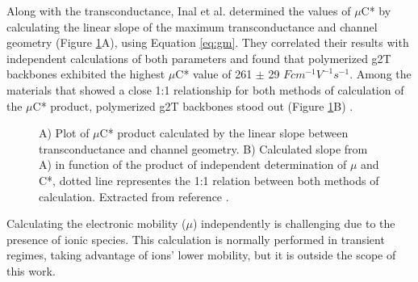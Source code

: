 Along with the transconductance, Inal et al. determined the values of $\mu$C* by calculating the linear slope of the maximum transconductance and channel geometry (Figure \ref{fig:gmuc}A), using Equation \ref{eq:gm}. They correlated their results with independent calculations of both parameters and found that polymerized g2T backbones exhibited the highest $\mu$C* value of 261 $\pm$ 29 $Fcm^{-1}V^{-1}s^{-1}$. Among the materials that showed a close 1:1 relationship for both methods of calculation of the $\mu$C* product, polymerized g2T backbones stood out (Figure \ref{fig:gmuc}B) \cite{inalBenchmarkingOrganicMixed2017}.
 
 \begin{figure}[h]
 	\centering
 	\hspace{2em}
 	\caption[OECTs benchmark with different OMIECs]{A) Plot of $\mu$C* product calculated by the linear slope between transconductance and channel geometry. B) Calculated slope from A) in function of the product of independent determination of $\mu$ and C*, dotted line representes the 1:1 relation between both methods of calculation. Extracted from reference %
 		\cite{inalBenchmarkingOrganicMixed2017}.}
 	\label{fig:gmuc}
 \end{figure}

Calculating the electronic mobility ($\mu$) independently is challenging due to the presence of ionic species. This calculation is normally performed in transient regimes, taking advantage of ions' lower mobility, but it is outside the scope of this work. 


